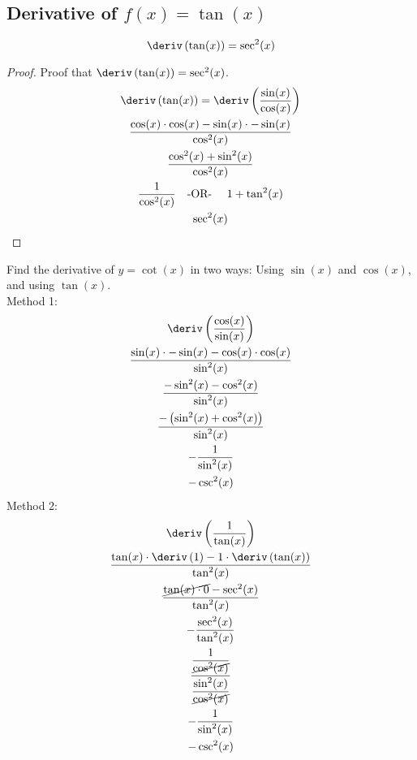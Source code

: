 \subsection{Derivative of \texorpdfstring{$f(x) = \tan(x)$}{f(x) = tan(x)} }
\begin{equation}
    \deriv \left(\tan(x)\right) = \sec^2(x)
\end{equation}
\begin{proof}
    Proof that $\deriv\left(\tan(x)\right) = \sec^2(x)$.
    \begin{gather*}
        \deriv \left(\tan(x)\right) = \deriv \left(\dfrac{\sin(x)}{\cos(x)}\right) \\
        \dfrac{\cos(x) \cdot \cos(x) - \sin(x) \cdot - \sin(x)}{\cos^2(x)} \\
        \dfrac{\cos^2(x) + \sin^2(x)}{\cos^2(x)} \\
        \dfrac{1}{\cos^2(x)} \text{\quad -OR- \quad} 1 + \tan^2(x) \\
        \sec^2(x)
    \end{gather*}
\end{proof}
\begin{example}
    Find the derivative of $y = \cot(x)$ in two ways: Using $\sin(x)$ and $\cos(x)$, and using $\tan(x)$. \\
    Method 1:
    \begin{gather*}
        \deriv\left(\dfrac{\cos(x)}{\sin(x)}\right) \\
        \dfrac{\sin(x) \cdot -\sin(x) - \cos(x) \cdot \cos(x)}{\sin^2(x)} \\
        \dfrac{-\sin^2(x) - \cos^2(x)}{\sin^2(x)} \\
        \dfrac{-\left(\sin^2(x) + \cos^2(x)\right)}{\sin^2(x)} \\
        -\dfrac{1}{\sin^2(x)} \\
        -\csc^2(x)
    \end{gather*}
    Method 2:
    \begin{gather*}
        \deriv\left(\dfrac{1}{\tan(x)}\right) \\
        \dfrac{\tan(x) \cdot \deriv\left(1\right) - 1 \cdot \deriv\left(\tan(x)\right)}{\tan^2(x)} \\
        \dfrac{\cancel{\tan(x) \cdot 0} - \sec^2(x)}{\tan^2(x)} \\
        -\dfrac{\sec^2(x)}{\tan^2(x)} \\
        \dfrac{\dfrac{1}{\cancel{\cos^2(x)}}}{\dfrac{\sin^2(x)}{\cancel{\cos^2(x)}}} \\
        -\dfrac{1}{\sin^2(x)} \\
        -\csc^2(x)
    \end{gather*}
\end{example}

